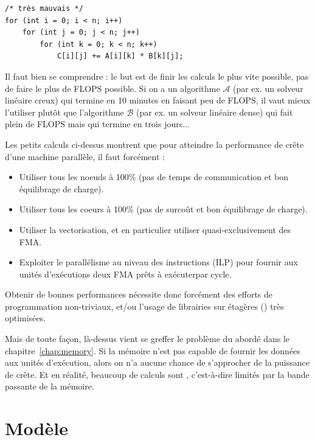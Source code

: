 \begin{verbatim}
/* très mauvais */
for (int i = 0; i < n; i++)
    for (int j = 0; j < n; j++)
        for (int k = 0; k < n; k++)
            C[i][j] += A[i][k] * B[k][j];
\end{verbatim}

\begin{danger}
  Il faut bien se comprendre : le but est de finir les calculs le plus vite
  possible, pas de faire le plus de FLOPS possible. Si on a un algorithme
  $\mathcal{A}$ (par ex. un solveur linéaire creux) qui termine en 10 minutes en
  faisant peu de FLOPS, il vaut mieux l'utiliser plutôt que l'algorithme
  $\mathcal{B}$ (par ex. un solveur linéaire dense) qui fait plein de FLOPS mais
  qui termine en trois jours...
\end{danger}

Les petits calculs ci-dessus montrent que pour atteindre la performance de crête
d'une machine parallèle, il faut forcément :
\begin{itemize}
\item Utiliser tous les noeuds à 100\% (pas de temps de communication et bon équilibrage de charge).
  
\item Utiliser tous les coeurs à 100\% (pas de surcoût et bon équilibrage de charge).

\item Utiliser la vectorisation, et en particulier utiliser quasi-exclusivement des FMA.

\item Exploiter le parallélisme au niveau des instructions (ILP) pour fournir aux unités d'exécutions deux FMA \og prêts à exécuter\fg par cycle.
\end{itemize}

\medskip

Obtenir de bonnes performances nécessite donc forcément des efforts de
programmation non-triviaux, et/ou l'usage de librairies \og sur étagères\fg
() très optimisées.

Mais de toute façon, là-dessus vient se greffer le problème du  abordé dans le chapitre~\ref{chap:memory}. Si la mémoire n'est pas
capable de fournir les données aux unités d'exécution, alors on n'a aucune
chance de s'approcher de la puissance de crête. Et en réalité, beaucoup de
calculs sont , c'est-à-dire limités par la bande passante
de la mémoire.

\section{Modèle \og {}\fg}

